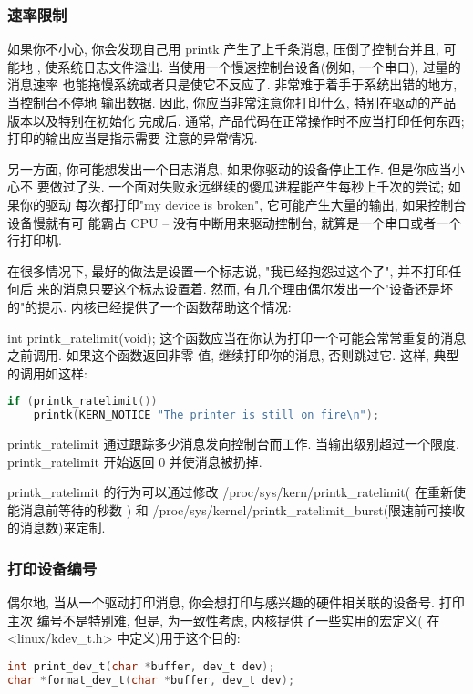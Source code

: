\documentclass[a4paper,titlepage]{article}
\begin{document}
\subsubsection{速率限制} 
如果你不小心, 你会发现自己用 printk 产生了上千条消息, 压倒了控制台并且, 可能地
, 使系统日志文件溢出. 当使用一个慢速控制台设备(例如, 一个串口), 过量的消息速率
也能拖慢系统或者只是使它不反应了. 非常难于着手于系统出错的地方, 当控制台不停地
输出数据. 因此, 你应当非常注意你打印什么, 特别在驱动的产品版本以及特别在初始化
完成后. 通常, 产品代码在正常操作时不应当打印任何东西; 打印的输出应当是指示需要
注意的异常情况.

另一方面, 你可能想发出一个日志消息, 如果你驱动的设备停止工作. 但是你应当小心不
要做过了头. 一个面对失败永远继续的傻瓜进程能产生每秒上千次的尝试; 如果你的驱动
每次都打印"my device is broken", 它可能产生大量的输出, 如果控制台设备慢就有可
能霸占 CPU -- 没有中断用来驱动控制台, 就算是一个串口或者一个行打印机.

在很多情况下, 最好的做法是设置一个标志说, "我已经抱怨过这个了", 并不打印任何后
来的消息只要这个标志设置着. 然而, 有几个理由偶尔发出一个"设备还是坏的"的提示.
内核已经提供了一个函数帮助这个情况:

int printk_ratelimit(void); 
这个函数应当在你认为打印一个可能会常常重复的消息之前调用. 如果这个函数返回非零
值, 继续打印你的消息, 否则跳过它. 这样, 典型的调用如这样:
\begin{lstlisting}[language=c]
if (printk_ratelimit())
    printk(KERN_NOTICE "The printer is still on fire\n");
\end{lstlisting}

printk_ratelimit 通过跟踪多少消息发向控制台而工作. 当输出级别超过一个限度, printk_ratelimit 开始返回 0 并使消息被扔掉.

printk_ratelimit 的行为可以通过修改 /proc/sys/kern/printk_ratelimit( 在重新使能消息前等待的秒数 ) 和 /proc/sys/kernel/printk_ratelimit_burst(限速前可接收的消息数)来定制.

\subsubsection{打印设备编号} 
偶尔地, 当从一个驱动打印消息, 你会想打印与感兴趣的硬件相关联的设备号. 打印主次
编号不是特别难, 但是, 为一致性考虑, 内核提供了一些实用的宏定义( 在
<linux/kdev_t.h> 中定义)用于这个目的: 
\begin{lstlisting}[language=c]
int print_dev_t(char *buffer, dev_t dev); 
char *format_dev_t(char *buffer, dev_t dev);
\end{lstlisting}
\end{document}
